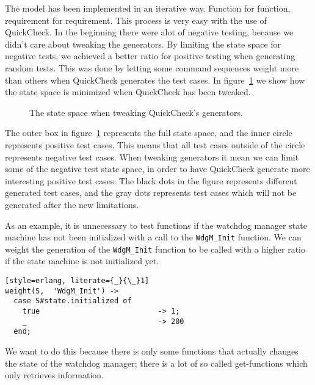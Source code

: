 
The model has been implemented in an iterative way. Function for
function, requirement for requirement. This process is very easy with
the use of QuickCheck.  In the beginning there were alot of negative
testing, because we didn't care about tweaking the generators.
By limiting the state space for negative tests, we achieved a better
ratio for positive testing when generating random tests. This was done
by letting some command sequences weight more than others when
QuickCheck generates the test cases. In
figure~\ref{QUICKCHECK:TWEAKING} we show how the state space is
minimized when QuickCheck has been tweaked.

\begin{figure}[!ht]
  \begin{center}
    \begin{minipage}[b]{0.6\linewidth}
      
    \end{minipage}
  \end{center}
  \caption{The state space when tweaking QuickCheck's generators.}
  \label{QUICKCHECK:TWEAKING}
\end{figure}
The outer box in figure~\ref{QUICKCHECK:TWEAKING} represents the full
state space, and the inner circle represents positive test cases. This
means that all test cases outside of the circle represents negative
test cases. When tweaking generators it mean we can limit some of the
negative test state space, in order to have QuickCheck generate more
interesting positive test cases. The black dots in the figure
represents different generated test cases, and the gray dots
represents test cases which will not be generated after the new
limitations.

As an example, it is unnecessary to test functions if the watchdog
manager state machine has not been initialized with a call to the
\lstinline!WdgM_Init! function. We can weight the generation
of the \lstinline!WdgM_Init! function to be called with a higher ratio
if the state machine is not initialized yet.

\begin{lstlisting}[style=erlang, literate={_}{\_}1]
weight(S,  'WdgM_Init') ->
  case S#state.initialized of
    true                           -> 1;
    _                              -> 200
  end;
\end{lstlisting}

We want to do this because there is only some functions that actually
changes the state of the watchdog manager; there is a lot of so called
get-functions which only retrieves information.

